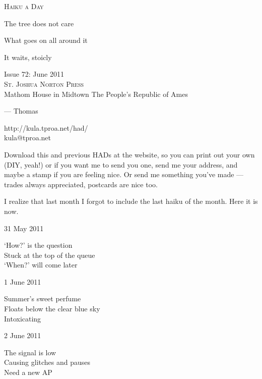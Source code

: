 \documentclass[12pt]{article}
\begin{document}
\begin{center}
{\fontsize{36}{48}\selectfont \textsc{Haiku a Day }}
\end{center}

\vspace*{3.5cm}

{\fontsize{20}{40}\selectfont 


The tree does not care

What goes on all around it

It waits, stoicly


}

\vspace*{5.0cm}
\begin{center}
{\large{Issue 72: June 2011}} \\[5mm]
{\fontsize{8}{8}\selectfont  \textsc{ St. Joshua Norton Press }} \\[1mm]
{\fontsize{6}{6}\selectfont Mathom House in Midtown \textbar The People's Republic of Ames }
\end{center}


\newpage

--- Thomas

http://kula.tproa.net/had/ \\
kula@tproa.net

Download this and previous HADs at the website, so you can
print out your own (DIY, yeah!) or if you want me to send
you one, send me your address, and maybe a stamp if you
are feeling nice. Or send me something you've made ---
trades always appreciated, postcards are nice too.

\vfill

I realize that last month I forgot to include the last haiku of
the month. Here it is now.

31 May 2011

`How?' is the question \\
Stuck at the top of the queue \\
`When?' will come later

1 June 2011

Summer's sweet perfume \\
Floats below the clear blue sky \\
Intoxicating

2 June 2011

The signal is low \\
Causing glitches and pauses \\
Need a new AP

\newpage
\end{document}
